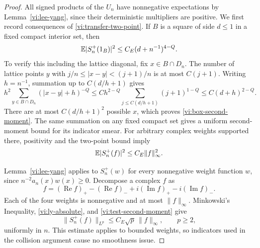 \begin{proof}
All signed products of the $U_n$ have nonnegative expectations by
Lemma~\ref{vi:lee-yang}, since their deterministic multipliers are positive.
We first record consequences of \eqref{vi:transfer-two-point}.
If $B$ is a square of side $d\leq1$ in a fixed compact interior set, then
\begin{equation}\label{vi:box-second-moment}
 \mathbb E|S_n^+(1_B)|^2\leq C_E(d+n^{-1})^{4-Q}.
\end{equation}
To verify this including the lattice diagonal, fix $x\in B\cap D_n$.
The number of lattice points $y$ with
$j/n\leq|x-y|<(j+1)/n$ is at most $C(j+1)$.
Writing $h=n^{-1}$, summation up to $C(d/h+1)$ gives
\[
 h^2\sum_{y\in B\cap D_n}(|x-y|+h)^{-Q}
 \leq C h^{2-Q}\sum_{j\leq C(d/h+1)}(j+1)^{1-Q}
 \leq C(d+h)^{2-Q}.
\]
There are at most $C(d/h+1)^2$ possible $x$, which proves
\eqref{vi:box-second-moment}.
The same summation on any fixed compact set gives a uniform second-moment
bound for its indicator smear.  For arbitrary complex weights supported
there, positivity and the two-point bound imply
\begin{equation}\label{vi:test-second-moment}
 \mathbb E|S_n^+(f)|^2\leq C_E\|f\|_\infty^2.
\end{equation}

Lemma~\ref{vi:lee-yang} applies to $S_n^+(w)$ for every nonnegative
weight function $w$, since $n^{-2}a_n(x)w(x)\geq0$.
Decompose a complex $f$ as
\[
 f=(\operatorname{Re}f)_+-(\operatorname{Re}f)_-
       +i(\operatorname{Im}f)_+-i(\operatorname{Im}f)_-.
\]
Each of the four weights is nonnegative and at most $\|f\|_\infty$.
Minkowski's Inequality, \eqref{vi:ly-absolute}, and
\eqref{vi:test-second-moment} give
\begin{equation}\label{vi:test-all-moments}
 \|S_n^+(f)\|_{L^p}\leq C_E\sqrt p\,\|f\|_\infty,
                       \qquad p\geq2,
\end{equation}
uniformly in $n$.  This estimate applies to bounded weights, so indicators
used in the collision argument cause no smoothness issue.


\end{proof}
